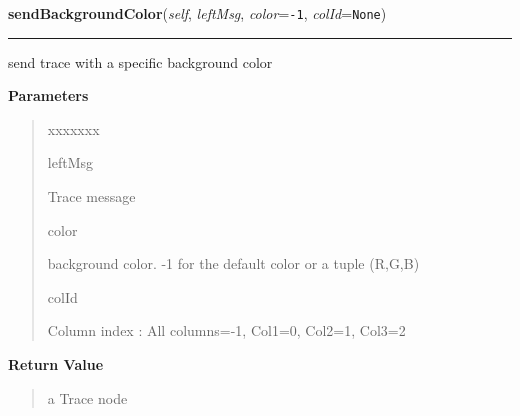 \hspace{.8\funcindent}\begin{boxedminipage}{\funcwidth}

    \raggedright \textbf{sendBackgroundColor}(\textit{self}, \textit{leftMsg}, \textit{color}={\tt -1}, \textit{colId}={\tt None})

    \vspace{-1.5ex}

    \rule{\textwidth}{0.5\fboxrule}
\setlength{\parskip}{2ex}
    send trace with a specific background color

\setlength{\parskip}{1ex}
      \textbf{Parameters}
      \vspace{-1ex}

      \begin{quote}
        \begin{Ventry}{xxxxxxx}

          \item[leftMsg]

          Trace message

          \item[color]

          background color. -1 for the default color or a tuple (R,G,B)

          \item[colId]

          Column index : All columns=-1, Col1=0, Col2=1, Col3=2

        \end{Ventry}

      \end{quote}

      \textbf{Return Value}
    \vspace{-1ex}

      \begin{quote}
      a Trace node

      \end{quote}

    \end{boxedminipage}

    \label{tracetool:TraceToSend:sendXml}

    \vspace{0.5ex}

